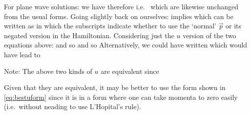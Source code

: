 For plane wave solutions:
%
we have therefore
%
i.e.~
%
which are likewise unchanged from the usual forms.
Going slightly back on ourselves:
%
implies
%
which can be written as 
%
in which the subscripts indicate whether to use the `normal' $\vec p$ or its negated version in the Hamiltonian.
Considering just the $u$ version of the two equations above:
%
and so
%
and so
%
Alternatively, we could have written
%
which would have lead to
%

Note: The above two kinds of $u$ are equivalent since 

Given that they are equivalent, it may be better to use the form shown in \eqref{eq:bestuform} since it is in a form where one can take momenta to zero easily (i.e.~without neading to use L'Hopital's rule). 

